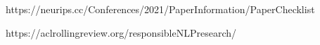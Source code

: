 
https://neurips.cc/Conferences/2021/PaperInformation/PaperChecklist

https://aclrollingreview.org/responsibleNLPresearch/
